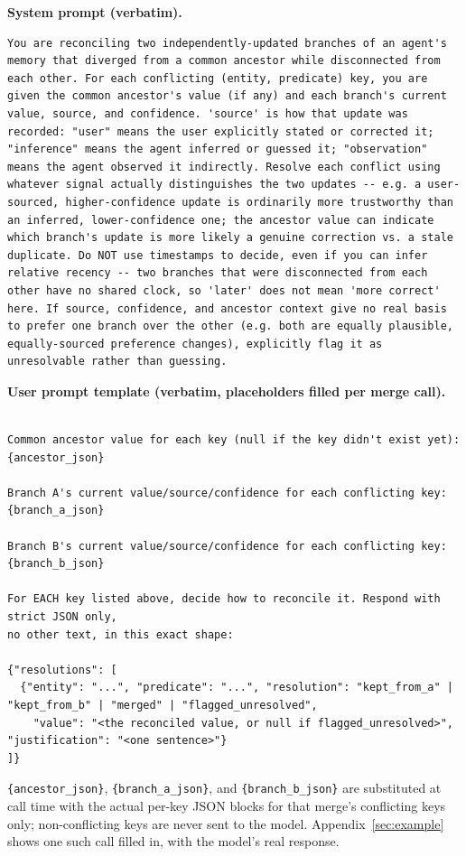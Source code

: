 \documentclass[11pt]{article}
\begin{document}
\noindent\textbf{System prompt (verbatim).}\par
\nolinenumbers
\begin{lstlisting}
You are reconciling two independently-updated branches of an agent's memory that diverged from a common ancestor while disconnected from each other. For each conflicting (entity, predicate) key, you are given the common ancestor's value (if any) and each branch's current value, source, and confidence. 'source' is how that update was recorded: "user" means the user explicitly stated or corrected it; "inference" means the agent inferred or guessed it; "observation" means the agent observed it indirectly. Resolve each conflict using whatever signal actually distinguishes the two updates -- e.g. a user-sourced, higher-confidence update is ordinarily more trustworthy than an inferred, lower-confidence one; the ancestor value can indicate which branch's update is more likely a genuine correction vs. a stale duplicate. Do NOT use timestamps to decide, even if you can infer relative recency -- two branches that were disconnected from each other have no shared clock, so 'later' does not mean 'more correct' here. If source, confidence, and ancestor context give no real basis to prefer one branch over the other (e.g. both are equally plausible, equally-sourced preference changes), explicitly flag it as unresolvable rather than guessing.
\end{lstlisting}
\linenumbers


\noindent\textbf{User prompt template (verbatim, placeholders filled per merge call).}\par
\nolinenumbers

\begin{lstlisting}

Common ancestor value for each key (null if the key didn't exist yet):
{ancestor_json}

Branch A's current value/source/confidence for each conflicting key:
{branch_a_json}

Branch B's current value/source/confidence for each conflicting key:
{branch_b_json}

For EACH key listed above, decide how to reconcile it. Respond with strict JSON only,
no other text, in this exact shape:

{"resolutions": [
  {"entity": "...", "predicate": "...", "resolution": "kept_from_a" | "kept_from_b" | "merged" | "flagged_unresolved",
    "value": "<the reconciled value, or null if flagged_unresolved>", "justification": "<one sentence>"}
]}
\end{lstlisting}
\linenumbers
\texttt{\{ancestor\_json\}}, \texttt{\{branch\_a\_json\}}, and
\texttt{\{branch\_b\_json\}} are substituted at call time with the actual
per-key JSON blocks for that merge's conflicting keys only; non-conflicting
keys are never sent to the model. Appendix~\ref{sec:example} shows one such
call filled in, with the model's real response.
\end{document}
